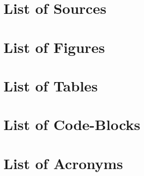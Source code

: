 \raggedright
\section{List of Sources}

\printbibliography[heading=none]

\clearpage
\section{List of Figures}
\onlylof

\clearpage
\section{List of Tables}
\onlylot

\clearpage
\section{List of Code-Blocks}
\onlylol

\clearpage
\section{List of Acronyms}
\begingroup
\renewcommand{\glossarysection}[2][]{}
\printglossary[type=\acronymtype]
\endgroup